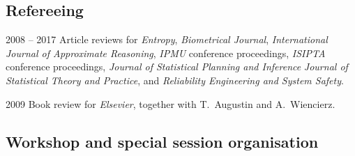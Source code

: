 \documentclass[a4paper]{simplecv}
\begin{document}
\subsection{Refereeing}
\begin{topic}
\item[2008 -- 2017] Article reviews for
\emph{Entropy},
\emph{Biometrical Journal},
\emph{International Journal of Approximate Reasoning},
\emph{IPMU} conference proceedings,
\emph{ISIPTA} conference proceedings,
\emph{Journal of Statistical Planning and Inference}
\emph{Journal of Statistical Theory and Practice}, and
\emph{Reliability Engineering and System Safety}.

\item[2009] Book review for \emph{Elsevier}, together with T.\ Augustin and A.\ Wiencierz.
\end{topic}

\subsection{Workshop and special session organisation}

\end{document}
